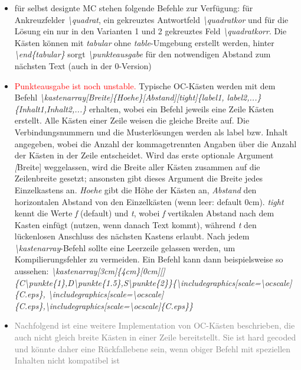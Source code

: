 \documentclass[./main.tex]{subfiles}
\begin{document}
\begin{itemize}
    \item f\"ur selbst designte MC stehen folgende Befehle zur Verf\"ugung: f\"ur Ankreuzfelder \textit{\hypertarget{quadrat}{\textbackslash quadrat}}, ein gekreuztes Antwortfeld \textit{\hypertarget{quadratkor}{\textbackslash quadratkor}} und f\"ur die L\"osung ein nur in den Varianten 1 und 2 gekreuztes Feld \textit{\hypertarget{quadratkorr}{\textbackslash quadratkorr}}. Die K\"asten k\"onnen mit \textit{tabular} ohne \textit{table}-Umgebung erstellt werden, hinter \textit{\textbackslash end\{tabular\}} sorgt \textit{\textbackslash punkteausgabe} f\"ur den notwendigen Abstand zum n\"achsten Text (auch in der 0-Version)
   \item \hypertarget{kastenarray}{} \textcolor{red}{Punkteausgabe ist noch unstable.} Typische OC-K\"asten werden mit dem Befehl \textit{\textbackslash{}kastenarray[Breite]\{Hoehe\}[Abstand][tight]\{label1, label2,...\}\{Inhalt1,Inhalt2,...\}} erhalten, wobei ein Befehl jeweils eine Zeile K\"asten erstellt. Alle K\"asten einer Zeile weisen die gleiche Breite auf. Die Verbindungsnummern und die Musterl\"osungen werden als label bzw. Inhalt angegeben, wobei die Anzahl der kommagetrennten Angaben \"uber die Anzahl der K\"asten in der Zeile entscheidet. Wird das erste optionale Argument \textit[Breite] weggelassen, wird die Breite aller K\"asten zusammen auf die Zeilenbreite gesetzt; ansonsten gibt dieses Argument die Breite jedes Einzelkastens an. \textit{Hoehe} gibt die H\"ohe der K\"asten an, \textit{Abstand} den horizontalen Abstand von den Einzelk\"asten (wenn leer: default 0cm). \textit{tight} kennt die Werte \textit{f} (default) und \textit{t}, wobei \textit{f} vertikalen Abstand nach dem Kasten einf\"ugt (nutzen, wenn danach Text kommt), w\"ahrend \textit{t} den l\"uckenlosen Anschluss des n\"achsten Kastens erlaubt. Nach jedem \textit{\textbackslash{}kastenarray}-Befehl sollte eine Leerzeile gelassen werden, um Kompilierungsfehler zu vermeiden. Ein Befehl kann dann beispielsweise so aussehen: \textit{\textbackslash{}kastenarray[3cm]\{4cm\}[0cm][]\{C\textbackslash{}punkte\{1\},D\textbackslash{}punkte\{1.5\},S\textbackslash{}punkte\{2\}\}\{\textbackslash{}includegraphics[scale=\textbackslash{}ocscale]\{C.eps\}, \textbackslash{}includegraphics[scale=\textbackslash{}ocscale]\{C.eps\},\textbackslash{}includegraphics[scale=\textbackslash{}ocscale]\{C.eps\}\}}
    \item \textcolor{gray}{Nachfolgend ist eine weitere Implementation von OC-K\"asten beschrieben, die auch nicht gleich breite K\"asten in einer Zeile bereitstellt. Sie ist hard gecoded und k\"onnte daher eine R\"uckfallebene sein, wenn obiger Befehl mit speziellen Inhalten nicht kompatibel ist \hypertarget{oc}{} \hypertarget{ocanfang}{} \hypertarget{ochilf}{} \hypertarget{ockasten}{}\\
}
\end{itemize}
\end{document}
